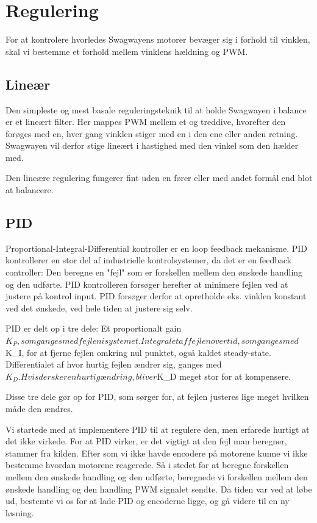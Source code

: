 \documentclass[a4paper,oneside,article,danish,table]{memoir}
\begin{document}
\section{Regulering}
For at kontrolere hvorledes Swagwayens motorer bevæger sig i forhold til vinklen, skal vi bestemme et forhold mellem vinklens hældning og PWM. 
\subsection{Lineær}
Den simpleste og mest basale reguleringsteknik til at holde Swagwayen i balance er et lineært filter. Her mappes PWM mellem et og treddive, hvorefter den forøges med en, hver gang vinklen stiger med en i den ene eller anden retning. Swagwayen vil derfor stige lineært i hastighed med den vinkel som den hælder med.

Den lineære regulering fungerer fint uden en fører eller med andet formål end blot at balancere.
\subsection{PID}
Proportional-Integral-Differential kontroller er en loop feedback mekanisme. PID kontrollerer en stor del af industrielle kontrolsystemer, da det er en feedback controller: Den beregne en "fejl" som er forskellen mellem den ønskede handling og den udførte. PID kontrolleren forsøger herefter at minimere fejlen ved at justere på kontrol input. PID forsøger derfor at opretholde eks. vinklen konstant ved det ønskede, ved hele tiden at justere sig selv. 

PID er delt op i tre dele: 
Et proportionalt gain $K_P, som ganges med fejlen i systemet.
Integralet af fejlen over tid, som ganges med $K_I, for at fjerne fejlen omkring nul punktet, også kaldet steady-state.
Differentialet af hvor hurtig fejlen ændrer sig, ganges med $K_D. Hvis der sker en hurtig ændring, bliver $K_D meget stor for at kompensere.

Disse tre dele gør op for PID, som sørger for, at fejlen justeres lige meget hvilken måde den ændres.

Vi startede med at implementere PID til at regulere den, men erfarede hurtigt at det ikke virkede. For at PID virker, er det vigtigt at den fejl man beregner, stammer fra kilden. Efter som vi ikke havde encodere på motorene kunne vi ikke bestemme hvordan motorene reagerede. Så i stedet for at beregne forskellen mellem den ønskede handling og den udførte, beregnede vi forskellen mellem den ønskede handling og den handling PWM signalet sendte. Da tiden var ved at løbe ud, bestemte vi os for at lade PID og encoderne ligge, og gå videre til en ny løsning.
\end{document}
